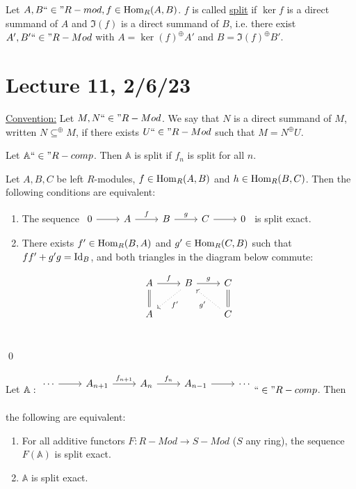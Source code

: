 \documentclass[x11names,reqno,14pt]{extarticle}
\newcommand{\A}{\mathbb{A}}
\newcommand{\fin}{``\in"}
\begin{document}

Let $A, B \fin R-mod, f \in \Hom_R(A, B)$. $f$ is called \underline{split} if $\ker f$ is a direct summand of $A$ and $\Im(f)$ is a direct summand of $B$, i.e. there exist $A', B' \fin R-Mod$ with $A = \ker(f)^{\oplus} A'$ and $B = \Im(f)^\oplus B'$.

\section*{Lecture 11, 2/6/23}

\underline{Convention:} Let $M, N \fin R-Mod$. We say that $N$ is a direct summand of $M$, written $N\subseteq^\oplus M$, if there exists $U \fin R-Mod$ such that $M = N^{\oplus} U$.


Let $\A\fin R-comp$. Then $\A$ is split if $f_n$ is split for all $n$.

\prop

Let $A, B, C$ be left $R$-modules, $f \in{\mathrm{Hom}}_R(A, B)$ and $h\in{\mathrm{Hom}}_R(B, C)$. Then the following conditions are equivalent:

\begin{enumerate}

\item The sequence $\exactshort{A}{f}{B}{g}{C}$ is split exact. 

\item There exists $f'\in{\mathrm{Hom}}_R(B, A)$ and $g'\in{\mathrm{Hom}}_R(C, B)$ such that $ff' + g'g = \operatorname{\mathrm{Id}}_B$, and both triangles in the diagram below commute:

\[
\begin{tikzcd}
A\ar[r, "f"]\ar[d, equal]&\ar[dl, dotted, "f'"]B\ar[r, "g"]& C\ar[d, equal] \\
A & & C\ar[lu, dotted, "g'"] \\ 
\end{tikzcd}
\]

\end{enumerate}

\proof

\qed

\thm

Let $\A:\begin{tikzcd} \cdots\ar[r]& A_{n + 1}\ar[r, "f_{n + 1}"]& A_n\ar[r, "f_n"] & A_{n - 1}\ar[r] & \cdots \\ \end{tikzcd}\fin R-comp$. Then the following are equivalent:

\begin{enumerate}

\item For all additive functors $F:R-Mod\to S-Mod$ ($S$ any ring), the sequence $F(\A)$ is split exact. 

\item $\A$ is split exact.

\end{enumerate}
\end{document}
